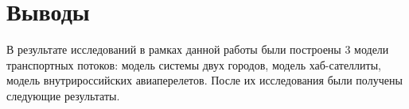 \documentclass[a4paper,12pt]{article} %
\begin{document}






\section{Выводы}
В результате исследований в рамках данной работы были построены 3 модели транспортных потоков: модель системы двух городов, модель хаб-сателлиты, модель внутрироссийских авиаперелетов. После их исследования были получены следующие результаты.
\end{document}
